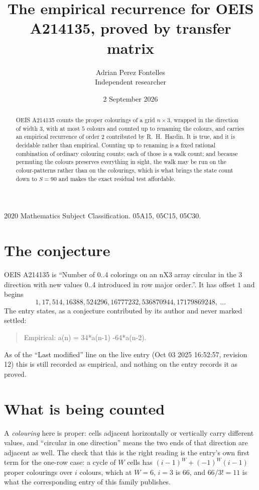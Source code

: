 \documentclass[11pt,a4paper]{article}
\title{The empirical recurrence for OEIS A214135, proved by transfer matrix}
\author{Adrian Perez Fontelles\\ \small Independent researcher}
\date{2 September 2026}
\theoremstyle{plain}
\theoremstyle{definition}
\begin{document}
\maketitle

\begin{abstract}
OEIS A214135 counts the proper colourings of a grid $n\times3$, wrapped in the direction of width $3$, with at most $5$ colours and
counted up to renaming the colours, and carries an empirical recurrence of order $2$
contributed by R.~H.~Hardin. It is true, and it is decidable rather than empirical. Counting
up to renaming is a fixed rational combination of ordinary colouring counts; each of those is
a walk count; and because permuting the colours preserves everything in sight, the walk may be
run on the colour-patterns rather than on the colourings, which is what brings the state count
down to $S=90$ and makes the exact residual test affordable.
\end{abstract}

\noindent\small 2020 Mathematics Subject Classification. 05A15, 05C15, 05C30.\normalsize

\section{The conjecture}

OEIS A214135 is ``Number of 0..4 colorings on an nX3 array circular in the 3 direction with new values 0..4 introduced in row major order.''. It has offset $1$ and begins
\[
1, 17, 514, 16388, 524296, 16777232, 536870944, 17179869248,\ \dots
\]
The entry states, as a conjecture contributed by its author and never marked settled:
\begin{quote}
Empirical: a(n) = 34*a(n-1) -64*a(n-2).
\end{quote}
As of the ``Last modified'' line on the live entry (Oct 03 2025 16:52:57, revision 12) this is still
recorded as empirical, and nothing on the entry records it as proved.

\section{What is being counted}

A \emph{colouring} here is proper: cells adjacent horizontally or vertically carry different
values, and ``circular in one direction'' means the two ends of that direction are adjacent as
well. The check that this is the right reading is the entry's own first term for the
one-row case: a cycle of $W$ cells has $(i-1)^W+(-1)^W(i-1)$ proper colourings over $i$
colours, which at $W=6$, $i=3$ is $66$, and $66/3!=11$ is what the corresponding entry of this
family publishes.
\end{document}
